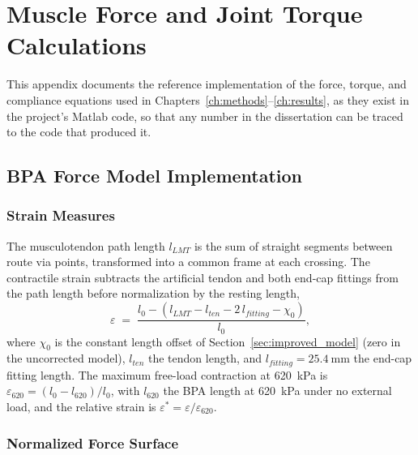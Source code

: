 
\chapter{Muscle Force and Joint Torque Calculations}\label{app:muscle_calcs}

This appendix documents the reference implementation of the force, torque, and
compliance equations used in Chapters~\ref{ch:methods}--\ref{ch:results}, as
they exist in the project's Matlab code, so that any number in the dissertation
can be traced to the code that produced it.

\section{BPA Force Model Implementation}

\subsection{Strain Measures}

The musculotendon path length $l_{LMT}$ is the sum of straight segments between
route via points, transformed into a common frame at each crossing. The
contractile strain subtracts the artificial tendon and both end-cap fittings
from the path length before normalization by the resting length,
\begin{equation}
    \varepsilon \;=\; \frac{l_{0} - \left(l_{LMT} - l_{ten} - 2\,l_{fitting} - \chi_{0}\right)}{l_{0}},
    \label{eq:app_strain}
\end{equation}
where $\chi_{0}$ is the constant length offset of
Section~\ref{sec:improved_model} (zero in the uncorrected model),
$l_{ten}$ the tendon length, and $l_{fitting} = \qty{25.4}{\mm}$ the end-cap
fitting length. The maximum free-load contraction at \qty{620}{\kPa} is
$\varepsilon_{620} = (l_{0}-l_{620})/l_{0}$, with $l_{620}$ the BPA length at
\qty{620}{\kPa} under no external load, and the relative strain is
$\varepsilon^{*} = \varepsilon / \varepsilon_{620}$.

\subsection{Normalized Force Surface}

